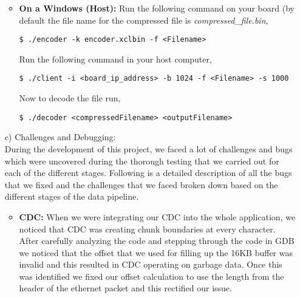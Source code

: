 \documentclass[../main.tex]{subfiles}
\begin{document}
\begin{enumerate}
\begin{itemize}
        \item \textbf{On a Windows (Host):}
            Run the following command on your board (by default the file name for the compressed file is \textit{compressed\_file.bin},
            \begin{verbatim}
$ ./encoder -k encoder.xclbin -f <Filename>
            \end{verbatim}
            Run the following command in your host computer,
            \begin{verbatim}
$ ./client -i <board_ip_address> -b 1024 -f <Filename> -s 1000
            \end{verbatim}
            Now to decode the file run,
            \begin{verbatim}
$ ./decoder <compressedFilename> <outputFilename>
            \end{verbatim}
    \end{itemize}

\item[c)] Challenges and Debugging:\\
During the development of this project, we faced a lot of challenges and bugs which were uncovered during the thorough testing that we carried out for each of the different stages. Following is a detailed description of all the bugs that we fixed and the challenges that we faced broken down based on the different stages of the data pipeline.
\begin{itemize}
    \item \textbf{CDC:} When we were integrating our CDC into the whole application, we noticed that CDC was creating chunk boundaries at every character. After carefully analyzing the code and stepping through the code in GDB we noticed that the offset that we used for filling up the 16KB buffer was invalid and this resulted in CDC operating on garbage data. Once this was identified we fixed our offset calculation to use the length from the header of the ethernet packet and this rectified our issue. \\
    

\end{itemize}
\end{enumerate}
\end{document}
